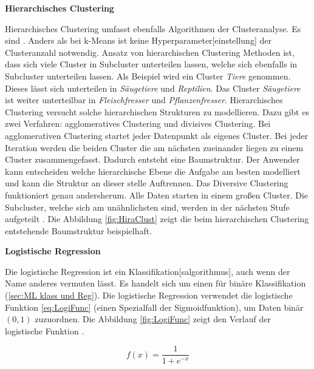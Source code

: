 \textbf{Hierarchisches Clustering} \par
Hierarchisches Clustering umfasst ebenfalls Algorithmen der Clusteranalyse. Es sind . Anders als bei k-Means ist keine \gls{Hyperparameter}[einstellung] der Clusteranzahl notwendig. Ansatz von hierarchischen Clustering Methoden ist, dass sich viele Cluster in Subcluster unterteilen lassen, welche sich ebenfalls in Subcluster unterteilen lassen. Als Beispiel wird ein Cluster \textit{Tiere} genommen. Dieses lässt sich unterteilen in \textit{Säugetiere} und \textit{Reptilien}. Das Cluster \textit{Säugetiere} ist weiter unterteilbar in \textit{Fleischfresser} und \textit{Pflanzenfresser}. Hierarchisches Clustering versucht solche hierarchischen Strukturen zu modellieren. Dazu gibt es zwei Verfahren: agglomeratives Clustering und divisives Clustering. Bei agglomerativen Clustering startet jeder Datenpunkt als eigenes Cluster. Bei jeder Iteration werden die beiden Cluster die am nächsten zueinander liegen zu einem Cluster zusammengefasst. Dadurch entsteht eine Baumstruktur. Der Anwender kann entscheiden welche hierarchische Ebene die Aufgabe am besten modelliert und kann die Struktur an dieser stelle Auftrennen. Das Diversive Clustering funktioniert genau andersherum. Alle Daten starten in einem großen Cluster. Die Subcluster, welche sich am unähnlichsten sind, werden in der nächsten Stufe aufgeteilt \cite{Duda.2001}. Die Abbildung \ref{fig:HiraClust} zeigt die beim hierarchischen Clustering entstehende Baumstruktur beispielhaft. 


\dubpar
\textbf{Logistische Regression} \par
Die logistische Regression ist ein \gls{Klassifikation}[salgorithmus], auch wenn der Name anderes vermuten lässt. Es handelt sich um einen  für binäre \gls{Klassifikation} (\ref{sec:ML klass und Reg}). Die logistische Regression verwendet die logistische Funktion \ref{eq:LogiFunc} (einen Spezialfall der Sigmoidfunktion), um Daten binär \((0,1)\) zuzuordnen. Die Abbildung \ref{fig:LogiFunc} zeigt den Verlauf der logistische Funktion \cite{Burkov.2019}. 

\begin{equation}
f(x) = \frac{1}{1 + e^{-x}}
\label{eq:LogiFunc}
\end{equation}


